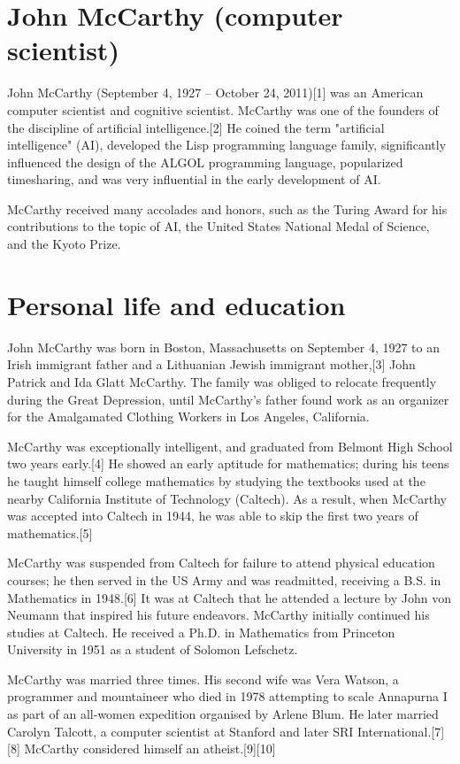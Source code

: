 \documentclass[pdftex, a4paper, 12pt]{article}
\begin{document}
\section{John McCarthy (computer scientist)}
\author{From Wikipedia, the free encyclopedia}

{\raggedright John McCarthy (September 4, 1927 – October 24, 2011)[1] was an American computer scientist and cognitive scientist. McCarthy was one of the founders of the discipline of artificial intelligence.[2] He coined the term "artificial intelligence" (AI), developed the Lisp programming language family, significantly influenced the design of the ALGOL programming language, popularized timesharing, and was very influential in the early development of AI.

McCarthy received many accolades and honors, such as the Turing Award for his contributions to the topic of AI, the United States National Medal of Science, and the Kyoto Prize.
}

\section{Personal life and education}


{\raggedright John McCarthy was born in Boston, Massachusetts on September 4, 1927 to an Irish immigrant father and a Lithuanian Jewish immigrant mother,[3] John Patrick and Ida Glatt McCarthy. The family was obliged to relocate frequently during the Great Depression, until McCarthy's father found work as an organizer for the Amalgamated Clothing Workers in Los Angeles, California.

McCarthy was exceptionally intelligent, and graduated from Belmont High School two years early.[4] He showed an early aptitude for mathematics; during his teens he taught himself college mathematics by studying the textbooks used at the nearby California Institute of Technology (Caltech). As a result, when McCarthy was accepted into Caltech in 1944, he was able to skip the first two years of mathematics.[5]

McCarthy was suspended from Caltech for failure to attend physical education courses; he then served in the US Army and was readmitted, receiving a B.S. in Mathematics in 1948.[6] It was at Caltech that he attended a lecture by John von Neumann that inspired his future endeavors. McCarthy initially continued his studies at Caltech. He received a Ph.D. in Mathematics from Princeton University in 1951 as a student of Solomon Lefschetz.

McCarthy was married three times. His second wife was Vera Watson, a programmer and mountaineer who died in 1978 attempting to scale Annapurna I as part of an all-women expedition organised by Arlene Blum. He later married Carolyn Talcott, a computer scientist at Stanford and later SRI International.[7][8] McCarthy considered himself an atheist.[9][10]
}
\end{document}
